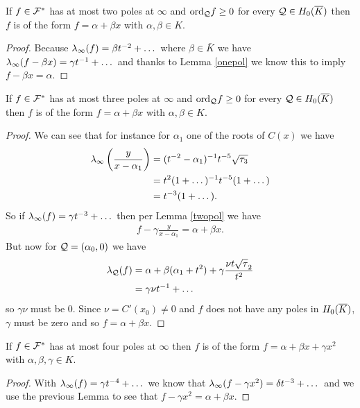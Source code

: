 \documentclass[english,11pt,a4paper]{article}
\begin{document}
\begin{lemma}\label{twopol}
	If $f \in \mathcal{F}^*$ has at most two poles at $\infty$ and $\text{ord}_{\mathcal{Q}} f \geq 0$ for every $\mathcal{Q} \in H_0(\overline K)$ then $f$ is of the form $f = \alpha + \beta x$ with $\alpha, \beta \in K$.
	\begin{proof}
		Because $\lambda_{\infty} (f) = \beta t^{-2} + \dots$ where $\beta \in \bar K$ we have $\lambda_{\infty} (f - \beta x)= \gamma t^{-1} + \dots$ and thanks to Lemma \ref{onepol} we know this to imply $f - \beta x = \alpha$.
	\end{proof}
\end{lemma}

\begin{lemma}
	If $f \in \mathcal{F}^*$ has at most three poles at $\infty$ and $\text{ord}_{\mathcal{Q}} f \geq 0$ for every $\mathcal{Q} \in H_0(\overline K)$ then $f$ is of the form $f = \alpha + \beta x$ with $\alpha, \beta \in K$.
	\begin{proof}
		We can see that for instance for $\alpha_1$ one of the roots of $C(x)$ we have
		\begin{align*}
			\lambda_{\infty} \left(\frac{y}{x-\alpha_1}\right) &= (t^{-2} - \alpha_1)^{-1} t^{-5} \sqrt{\tau_3}\\
			&= t^2 (1 + \dots)^{-1} t^{-5}(1 + \dots)\\
			&= t^{-3} (1 + \dots).
		\end{align*}
		So if $\lambda_{\infty} (f) = \gamma t^{-3} + \dots$ then per Lemma \ref{twopol} we have
		\begin{align*}
			f - \gamma \frac{y}{x-\alpha_1} = \alpha + \beta x.
		\end{align*}
		But now for $\mathcal{Q} = (\alpha_0, 0)$ we have
		\begin{align*}
		  \lambda_{\mathcal{Q}} (f) &= \alpha + \beta (\alpha_1 + t^2) + \gamma \frac{\nu t \sqrt \tau_2}{t^{2}}\\
		  &= \gamma \nu t^{-1} + \dots
		\end{align*}
		so $\gamma \nu$ must be 0. Since $\nu = C'(x_0) \neq 0$ and $f$ does not have any poles in $H_0(\overline K)$, $\gamma$ must be zero and so $f = \alpha + \beta x$.

	\end{proof}
\end{lemma}

\begin{lemma}
	If $f \in \mathcal{F}^*$ has at most four poles at $\infty$ then $f$ is of the form $f = \alpha + \beta x + \gamma x^2$ with $\alpha, \beta, \gamma \in K$.
	\begin{proof}
	  With $\lambda_{\infty} (f) = \gamma t^{-4} + \dots$ we know that $\lambda_{\infty} (f - \gamma x^2) = \delta t^{-3} + \dots$ and we use the previous Lemma to see that $f - \gamma x^2 = \alpha + \beta x$.
	\end{proof}
\end{lemma}
\end{document}

